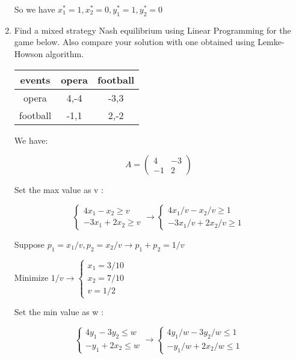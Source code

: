 \documentclass{article}
\newenvironment{answer}{\par\color{ForestGreen}}{\par}
\begin{document}
\begin{enumerate}
\begin{answer}
So we have $x_1^*= 1, x_2^*= 0, y_1^*= 1, y_2^*= 0$

\end{answer}
    \item
    Find a mixed strategy Nash equilibrium using Linear Programming for the game below. Also compare your solution with one obtained using Lemke-Howson algorithm.
    \begin{table}[h!]
      \centering
      \begin{tabular}{ccc}
        \toprule
        events & opera & football\\
        \midrule
        opera & 4,-4 & -3,3\\
        \hline
        football & -1,1 & 2,-2\\
        \bottomrule
     \end{tabular}
    \end{table}

    \begin{answer}
        We have:

        $$A = \begin{pmatrix}
              4 & -3 \\
              -1 & 2
            \end{pmatrix}$$

        Set the max value as v :

       $$
        \begin{cases}
          4x_1 - x_2 \geq v \\
          -3x_1 + 2x_2 \geq v
       \end{cases}
        \rightarrow
        \begin{cases}
          4x_1/v - x_2/v \geq 1 \\
          -3x_1/v + 2x_2/v \geq 1
       \end{cases}
       $$

       Suppose $p_1 = x_1/v, p_2 = x_2 /v \rightarrow p_1 + p_2 = 1/v$

       Minimize $1/v \rightarrow
       \begin{cases}
         x_1 = 3/10 \\
         x_2 = 7/10 \\
         v = 1/2
      \end{cases}
       $

       Set the min value as w :

      $$
       \begin{cases}
         4y_1 - 3y_2 \leq w \\
         -y_1 + 2x_2 \leq w
      \end{cases}
       \rightarrow
       \begin{cases}
         4y_1/w - 3y_2/w \leq 1 \\
         -y_1/w + 2x_2/w \leq 1
      \end{cases}
      $$


\end{answer}
\end{enumerate}
\end{document}

